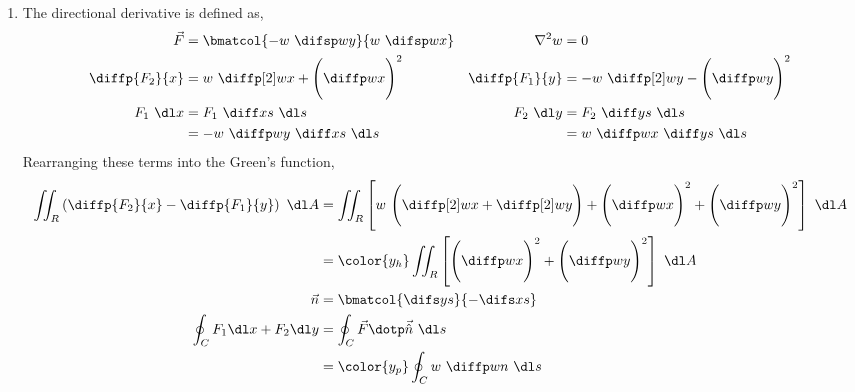 \begin{enumerate}
    \item The directional derivative is defined as,
          \begin{align}
              \vec{F}         & = \bmatcol{-w\ \difsp wy}{w\ \difsp wx}        &
              \nabla^2 w      & = 0                                              \\
              \diffp {F_2}{x} & = w\ \diffp[2] wx + \Bigg( \diffp wx \Bigg)^2  &
              \diffp {F_1}{y} & = -w\ \diffp[2] wy - \Bigg( \diffp wy \Bigg)^2   \\
              F_1\ \dl x      & = F_1\ \diff xs\ \dl s                         &
              F_2\ \dl y      & = F_2\ \diff ys\ \dl s                           \\
                              & = -w\ \diffp wy\ \diff xs\ \dl s               &
                              & = w\ \diffp wx\ \diff ys\ \dl s
          \end{align}
          Rearranging these terms into the Green's function,
          \begin{align}
              \iint_R \left( \diffp{F_2}{x}
              - \diffp{F_1}{y} \right)\ \dl A & =
              \iint_R \left[w\ \Bigg( \diffp[2] wx + \diffp[2] wy \Bigg)
              + \Bigg( \diffp wx \Bigg)^2 + \Bigg( \diffp wy \Bigg)^2\right]\ \dl A   \\
                                              & = \color{y_h}
              \iint_R \left[ \Bigg( \diffp wx \Bigg)^2
              + \Bigg( \diffp wy \Bigg)^2 \right]\ \dl A                              \\
              \vec{n}                         & = \bmatcol{\difs ys}
              {- \difs xs}                                                            \\
              \oint_C F_1 \dl x + F_2 \dl y   & = \oint_C \vec{F} \dotp \vec{\hat{n}}
              \ \dl s                                                                 \\
                                              & =  \color{y_p} \oint_C w\ \diffp wn
              \ \dl s
          \end{align}


\end{enumerate}
